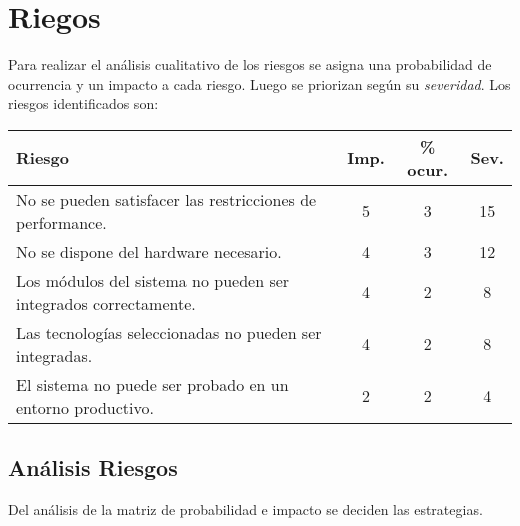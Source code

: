 \section*{Riegos}

Para realizar el análisis cualitativo de los riesgos se asigna una probabilidad de ocurrencia y un impacto a cada riesgo. Luego se priorizan según su \textit{severidad}. Los riesgos identificados son:

\begin{center}
\begin{tabular}{|l||c|c|c|}
\hline
Riesgo & Imp. & \% ocur. & Sev. \\
\hline
No se pueden satisfacer las restricciones de performance.  & 5 & 3 & 15 \\
No se dispone del hardware necesario. & 4 & 3 & 12 \\
Los módulos del sistema no pueden ser integrados correctamente. & 4 & 2 & 8 \\
Las tecnologías seleccionadas no pueden ser integradas. & 4 & 2 & 8 \\
El sistema no puede ser probado en un entorno productivo. & 2 & 2 & 4 \\

\hline
\end{tabular}
\end{center}

\subsection*{Análisis Riesgos}
Del análisis de la matriz de probabilidad e impacto se deciden las estrategias.

